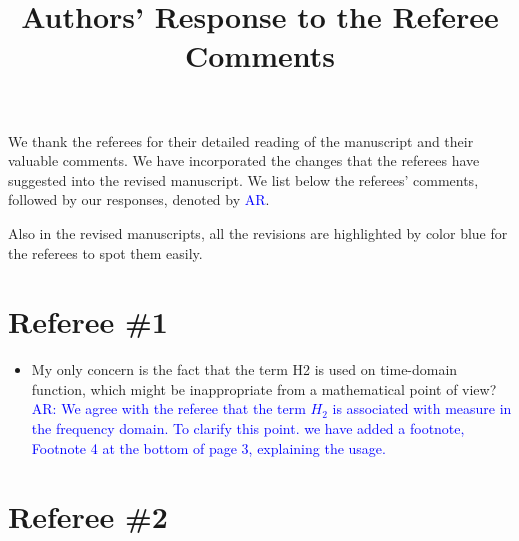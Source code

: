\documentclass[11pt]{article}
\title{Authors' Response to the Referee Comments}
\author{}
\date{}
\def\serkan#1{\textcolor{blue}{{#1}}}
\begin{document}
\maketitle

We thank the referees {for their detailed reading of the manuscript and their valuable comments}.
 We have incorporated the changes that the referees have suggested into the revised
manuscript.   We list below the referees' comments, followed by our responses, denoted by \serkan{\textsf{AR}}.  

Also in the revised manuscripts, all the revisions  are highlighted by color blue for the referees to spot them easily.

\section*{Referee \#1}%

\begin{itemize}
\item My only concern is the fact that the term H2 is used on time-domain
function, which might be inappropriate from a mathematical point of
view?\\[1ex]
\serkan{\textsf{AR}: We agree with the referee that the term $H_2$ is associated with measure in the frequency domain. To clarify this point. we have added a footnote, Footnote 4 at the bottom of page 3, explaining the usage.
} 
\end{itemize}

\section*{Referee \#2}
\end{document}
